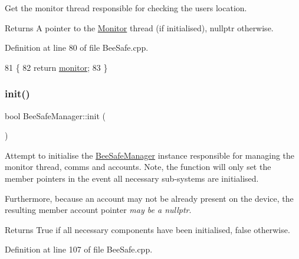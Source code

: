 Get the monitor thread responsible for checking the users location.

\begin{DoxyReturn}{Returns}
A pointer to the \hyperlink{class_monitor}{Monitor} thread (if initialised), nullptr otherwise. 
\end{DoxyReturn}


Definition at line 80 of file Bee\+Safe.\+cpp.


\begin{DoxyCode}
81 \{
82     \textcolor{keywordflow}{return} \hyperlink{class_bee_safe_manager_a3b885b4fb364228c914095f2e670f9af}{monitor};
83 \}
\end{DoxyCode}
\mbox{\label{class_bee_safe_manager_a2f16b09c454e21c887d14ac5483973cf}} 
\subsubsection{\texorpdfstring{init()}{init()}}
{\footnotesize\ttfamily bool Bee\+Safe\+Manager\+::init (\begin{DoxyParamCaption}{ }\end{DoxyParamCaption})}

Attempt to initialise the \hyperlink{class_bee_safe_manager}{Bee\+Safe\+Manager} instance responsible for managing the monitor thread, comms and accounts. Note, the function will only set the member pointers in the event all necessary sub-\/systems are initialised.

Furthermore, because an account may not be already present on the device, the resulting member account pointer {\itshape may be a nullptr}.

\begin{DoxyReturn}{Returns}
True if all necessary components have been initialised, false otherwise. 
\end{DoxyReturn}


Definition at line 107 of file Bee\+Safe.\+cpp.


